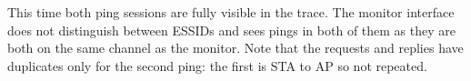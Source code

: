 This time both ping sessions are fully visible in the trace. The monitor interface does not distinguish between ESSIDs and sees pings in both of them as they are both on the same channel as the monitor. Note that the requests and replies have duplicates only for the second ping: the first is STA to AP so not repeated.
